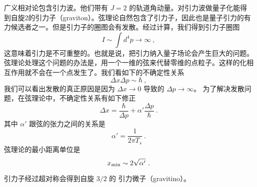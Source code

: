  
\begin{issues}
\issueNeedCite
\issueMissDepend
\end{issues}
 
 广义相对论包含引力波。他们带有 $J = 2$ 的轨道角动量。对引力波做量子化能得到自旋2的引力子（graviton）。弦理论自然包含了引力子，因此也是量子引力的有力候选者之一。但是引力子的圈图会有发散。经过计算，我们得到引力子圈图
\begin{equation}
I \sim \int d^4 p \rightarrow \infty ~,
\end{equation}
这意味着引力是不可重整的。也就是说，把引力纳入量子场论会产生巨大的问题。弦理论处理这个问题的办法是，用一个一维的弦来代替零维的点粒子。这样的化相互作用就不会在一个点发生了。我们看如下的不确定性关系
\begin{equation}
\Delta x \Delta p \sim \hbar  ~,
\end{equation}
我们可以看出发散的真正原因是因为 $\Delta x \rightarrow 0$ 导致的 $\Delta p \rightarrow  \infty  $。  为了解决发散问题，在弦理论中，不确定性关系有如下修正
\begin{equation}
\Delta x  = \frac{\hbar}{\Delta p} + \alpha' \frac{\Delta p}{\hbar }~.
\end{equation}
其中 $\alpha'$ 跟弦的张力之间的关系是
\begin{equation}
\alpha ' = \frac{1}{2 \pi T_s} ~.
\end{equation}
弦理论的最小距离单位是
\begin{equation}
x_{\rm min} \sim 2 \sqrt{\alpha'}~.
\end{equation}

引力子经过超对称会得到自旋 $3/2$ 的 引力微子（gravitino）。